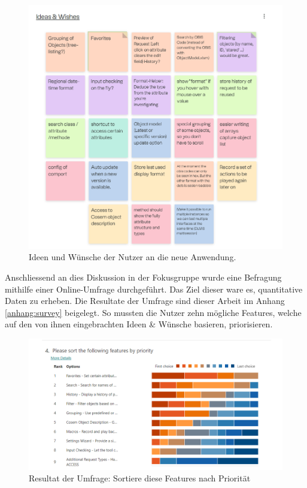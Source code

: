 \begin{figure}[H]
   \centering
   \includegraphics[width=1.0\textwidth]{gfx/S1_RetroBoard_IdeasAndWishes.png}
   \caption{
       Ideen und Wünsche der Nutzer an die neue Anwendung.
   }
   \label{fig:IdeasAndWishes}
\end{figure}
Anschliessend an dies Diskussion in der Fokusgruppe wurde eine Befragung mithilfe einer Online-Umfrage durchgeführt.
Das Ziel dieser ware es, quantitative Daten zu erheben.
Die Resultate der Umfrage sind dieser Arbeit im Anhang \ref{anhang:survey} beigelegt.
So mussten die Nutzer zehn mögliche Features, welche auf den von ihnen eingebrachten Ideen \& Wünsche basieren, priorisieren.


\begin{figure}[H]
   \centering
   \includegraphics[width=1.0\textwidth]{gfx/S1_Survey_Prio.png}
   \caption{
       Resultat der Umfrage: Sortiere diese Features nach Priorität
   }
   \label{fig:FeaturesPrio}
\end{figure}

